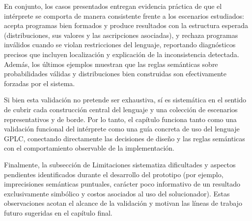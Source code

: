 En conjunto, los casos presentados entregan evidencia práctica de que
el intérprete se comporta de manera consistente frente a los
escenarios estudiados: acepta programas bien formados y produce
resultados con la estructura esperada (distribuciones, sus valores y
las ascripciones asociadas), y rechaza programas inválidos cuando se
violan restricciones del lenguaje, reportando diagnósticos precisos
que incluyen localización y explicación de la inconsistencia
detectada. Además, los últimos ejemplos muestran que las reglas
semánticas sobre probabilidades válidas y distribuciones bien
construidas son efectivamente forzadas por el sistema.

Si bien esta validación no pretende ser exhaustiva, sí es sistemática
en el sentido de cubrir cada construcción central del lenguaje y una
colección de escenarios representativos y de borde. Por lo tanto, el
capítulo funciona tanto como una validación funcional del intérprete
como una guía concreta de uso del lenguaje GPLC, conectando
directamente las decisiones de diseño y las reglas semánticas con el
comportamiento observable de la implementación.

Finalmente, la subsección de Limitaciones sistematiza dificultades y
aspectos pendientes identificados durante el desarrollo del prototipo
(por ejemplo, imprecisiones semánticas puntuales, carácter poco
informativo de un resultado exclusivamente simbólico y costos asociados
al uso del solucionador). Estas observaciones acotan el alcance de la
validación y motivan las líneas de trabajo futuro sugeridas en el
capítulo final.
